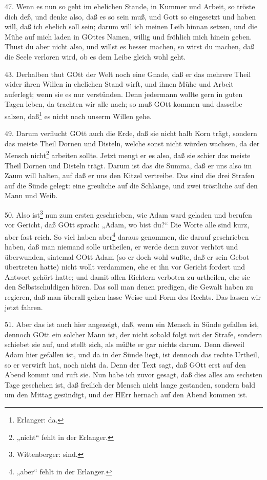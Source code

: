 47. Wenn es nun so geht im ehelichen Stande, in Kummer und Arbeit, so tröste dich deß, und denke also, daß es so sein muß, und
Gott so eingesetzt und haben will, daß ich ehelich soll sein; darum will ich meinen Leib hinnan setzen, und die Mühe auf mich laden in GOttes Namen, willig und fröhlich mich hinein geben. Thust du aber nicht also, und willst es besser machen, so wirst du machen, daß die Seele verloren wird, ob es dem Leibe gleich wohl geht.

43. Derhalben thut GOtt der Welt noch eine Gnade, daß er das mehrere Theil wider ihren Willen in ehelichen Stand wirft, und ihnen Mühe und Arbeit auferlegt; wenn sie es nur verstünden. Denn jedermann wollte gern in guten Tagen leben, da trachten wir alle nach; so muß GOtt kommen und dasselbe salzen, daß\footnote{Erlanger: da.} es nicht nach unserm Willen gehe.

49. Darum verflucht GOtt auch die Erde, daß sie nicht halb Korn trägt, sondern das meiste Theil Dornen und Disteln, welche sonst nicht würden wachsen, da der Mensch nicht\footnote{„nicht“ fehlt in der Erlanger.} arbeiten sollte. Jetzt mengt er es also, daß sie schier das meiste Theil Dornen und Disteln trägt. Darum ist das die Summa, daß er uns also im Zaum will halten, auf daß er uns den Kitzel vertreibe. Das sind die drei Strafen auf die Sünde gelegt: eine greuliche auf die Schlange, und zwei tröstliche auf den Mann und Weib.

50. Also ist\footnote{Wittenberger: sind.} nun zum ersten geschrieben, wie Adam ward geladen und berufen vor Gericht, daß GOtt sprach: „Adam, wo bist du?“ Die Worte alle sind kurz, aber fast reich. So viel haben aber\footnote{„aber“ fehlt in der Erlanger.} daraus genommen, die darauf geschrieben haben, daß man niemand solle urtheilen, er werde denn zuvor verhört und überwunden, sintemal GOtt Adam (so er doch wohl wußte, daß er sein Gebot übertreten hatte) nicht wollt verdammen, ehe er ihn vor Gericht fordert und Antwort gehört hatte; und damit allen Richtern verboten zu urtheilen, ehe sie den Selbstschuldigen hören. Das soll man denen predigen, die Gewalt haben zu regieren, daß man überall gehen lasse Weise und Form des Rechts. Das lassen wir jetzt fahren.

51. Aber das ist auch hier angezeigt, daß, wenn ein Mensch in Sünde gefallen ist, dennoch GOtt ein solcher Mann ist, der nicht sobald folgt mit der Strafe, sondern schiebet sie auf, und stellt sich, als müßte er gar nichts darum. Denn dieweil Adam hier gefallen ist, und da in der Sünde liegt, ist dennoch das rechte Urtheil, so er verwirft hat, noch nicht da. Denn der Text sagt, daß GOtt erst auf den Abend kommt und ruft sie. Nun habe ich zuvor gesagt, daß dies alles am sechsten Tage geschehen ist, daß freilich der Mensch nicht lange gestanden, sondern bald um den Mittag gesündigt, und der HErr hernach auf den Abend kommen ist.

